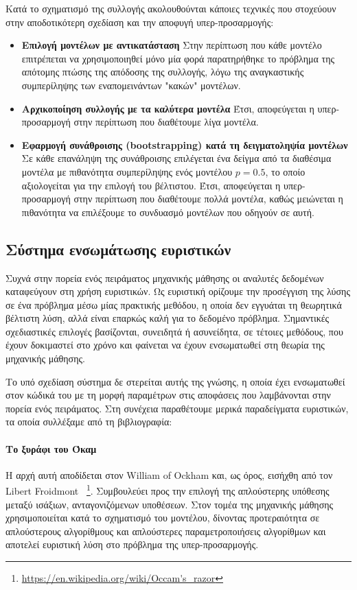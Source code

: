 Κατά το σχηματισμό της συλλογής ακολουθούνται κάποιες τεχνικές που στοχεύουν στην αποδοτικότερη σχεδίαση και την αποφυγή υπερ-προσαρμογής:
\begin{itemize}
	\item \textbf{Επιλογή μοντέλων με αντικατάσταση} Στην περίπτωση που κάθε μοντέλο επιτρέπεται να χρησιμοποιηθεί μόνο μία φορά παρατηρήθηκε το πρόβλημα της απότομης πτώσης της απόδοσης της συλλογής, λόγω της αναγκαστικής συμπερίληψης των εναπομεινάντων "κακών" μοντέλων. 
	\item \textbf{Αρχικοποίηση συλλογής με τα καλύτερα μοντέλα} Έτσι, αποφεύγεται η υπερ-προσαρμογή στην περίπτωση που διαθέτουμε λίγα μοντέλα.
	\item \textbf{Εφαρμογή συνάθροισης (bootstrapping) κατά τη δειγματοληψία μοντέλων} Σε κάθε επανάληψη της συνάθροισης επιλέγεται ένα δείγμα από τα διαθέσιμα μοντέλα με πιθανότητα συμπερίληψης ενός μοντέλου $p=0.5$, το οποίο αξιολογείται για την επιλογή του βέλτιστου. Έτσι, αποφεύγεται η υπερ-προσαρμογή στην περίπτωση που διαθέτουμε πολλά μοντέλα, καθώς μειώνεται η πιθανότητα να επιλέξουμε το συνδυασμό μοντέλων που οδηγούν σε αυτή.
\end{itemize} 
\subsection{Σύστημα ενσωμάτωσης ευριστικών}
Συχνά στην πορεία ενός πειράματος μηχανικής μάθησης οι αναλυτές δεδομένων καταφεύγουν στη χρήση ευριστικών. Ως ευριστική ορίζουμε την προσέγγιση της λύσης σε ένα πρόβλημα μέσω μίας πρακτικής μεθόδου, η οποία δεν εγγυάται τη θεωρητικά βέλτιστη λύση, αλλά είναι επαρκώς καλή για το δεδομένο πρόβλημα. Σημαντικές σχεδιαστικές επιλογές βασίζονται, συνειδητά ή ασυνείδητα, σε τέτοιες μεθόδους, που έχουν δοκιμαστεί στο χρόνο και φαίνεται να έχουν ενσωματωθεί στη θεωρία της μηχανικής μάθησης.

Το υπό σχεδίαση σύστημα δε στερείται αυτής της γνώσης, η οποία έχει ενσωματωθεί στον κώδικά του με τη μορφή παραμέτρων στις αποφάσεις που λαμβάνονται στην πορεία ενός πειράματος. Στη συνέχεια παραθέτουμε μερικά παραδείγματα ευριστικών, τα οποία συλλέξαμε από τη βιβλιογραφία:

\paragraph{Το ξυράφι του Όκαμ} Η αρχή αυτή αποδίδεται στον William of Ockham και, ως όρος, εισήχθη από τον Libert Froidmont ~\footnote{\url{https://en.wikipedia.org/wiki/Occam's\_razor}}. Συμβουλεύει προς την επιλογή της απλούστερης υπόθεσης μεταξύ ισάξιων, ανταγονιζόμενων υποθέσεων. Στον τομέα της μηχανικής μάθησης χρησιμοποιείται κατά το σχηματισμό του μοντέλου, δίνοντας προτεραιότητα σε απλούστερους αλγορίθμους και απλούστερες παραμετροποιήσεις αλγορίθμων και αποτελεί ευριστική λύση στο πρόβλημα της υπερ-προσαρμογής. 

